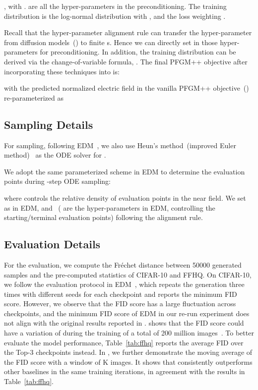 , with .  are all the hyper-parameters in the preconditioning. The training distribution  is the log-normal distribution with , and the loss weighting . 

Recall that the hyper-parameter alignment rule  can transfer the hyper-parameter from diffusion models~() to finite s. Hence we can directly set  in those hyper-parameters for preconditioning. In addition, the training distribution  can be derived via the change-of-variable formula, \ie . The final PFGM++ objective after incorporating these techniques into  is:

with the predicted normalized electric field in the vanilla PFGM++ objective~() re-parameterized as 

\subsection{Sampling Details}

For sampling, following EDM~\cite{Karras2022ElucidatingTD}, we also use Heun's  method~(improved Euler method)~\cite{Ascher1998ComputerMF} as the ODE solver for .

We adopt the same parameterized scheme in EDM to determine the evaluation points during -step ODE sampling:

where  controls the relative density of evaluation points in the near field. We set  as in EDM, and ~( are the hyper-parameters in EDM, controlling the starting/terminal evaluation points) following the  alignment rule.
\subsection{Evaluation Details}
\label{app:eval}
For the evaluation, we compute the Fréchet distance between 50000 generated samples and the pre-computed statistics of CIFAR-10 and FFHQ. On CIFAR-10, we follow the evaluation protocol in EDM~\cite{Karras2022ElucidatingTD}, which repeats the generation three times with different seeds for each checkpoint and reports the minimum FID score. However, we observe that the FID score has a large fluctuation across checkpoints, and the minimum FID score of EDM in our re-run experiment does not align with the original results reported in \cite{Karras2022ElucidatingTD}.  shows that the FID score could have a variation of  during the training of a total of 200 million images~\cite{Karras2022ElucidatingTD}. To better evaluate the model performance, Table~\ref{tab:ffhq} reports the average FID over the Top-3 checkpoints instead. In , we further demonstrate the moving average of the FID score with a window of K images. It shows that  consistently outperforms other baselines in the same training iterations, in agreement with the results in Table~\ref{tab:ffhq}.

